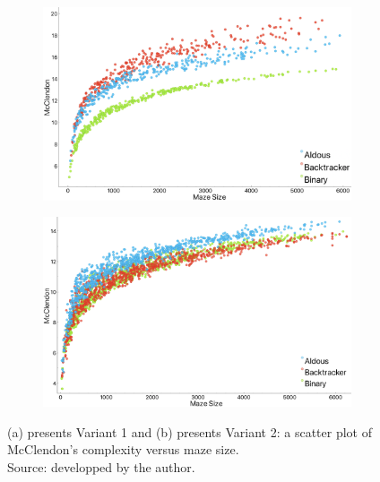         \begin{figure}[!h]
            \centering
            \begin{subfigure}[!h]{0.7\textwidth}
               \includegraphics[width=1\linewidth]{MClendon_variant1.png}
               \caption{}
            \end{subfigure}
            \begin{subfigure}[!h]{0.7\textwidth}
               \includegraphics[width=1\linewidth]{McClendon_variant2.png}
               \caption{}
            \end{subfigure}
            \caption{(a) presents Variant 1 and (b) presents Variant 2: a scatter plot of McClendon's complexity versus maze size.\\Source: developped by the author.}
            \end{figure}%
 \newpage
 \newline
 \newpage\
 \\
 \\
 \\
 \\
 \\
 \newline
 \newline
 \newline
 \newline
